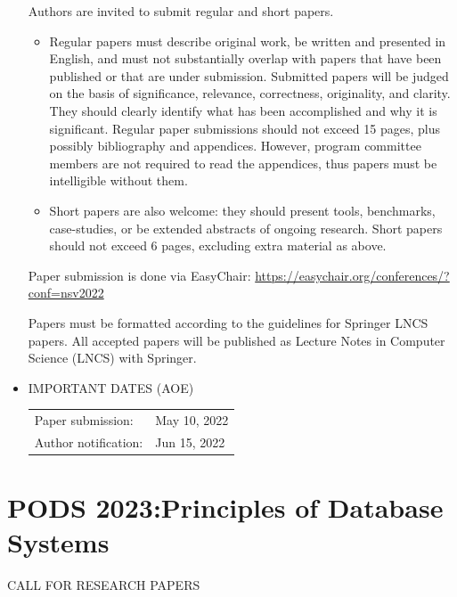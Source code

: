 \documentclass[prodmode,acmtecs]{acmsmall} %
\begin{document}
\begin{itemize}
  Authors are invited to submit regular and short papers. 
 
\begin{itemize}\item  Regular papers must describe original work, be written and presented in English, and must not substantially overlap with papers that have been published or that are under submission. Submitted papers will be judged on the basis of significance, relevance, correctness, originality, and clarity. They should clearly identify what has been accomplished and why it is significant. Regular paper submissions should not exceed 15 pages, plus possibly bibliography and appendices. However, program committee members are not required to read the appendices, thus papers must be intelligible without them.
\item  Short papers are also welcome: they should present tools, benchmarks, case-studies, or be extended abstracts of ongoing research. Short papers should not exceed 6 pages, excluding extra material as above.
\end{itemize} 
  Paper submission is done via EasyChair: \href{https://easychair.org/conferences/?conf=nsv2022}{https://easychair.org/conferences/?conf=nsv2022} 
 
  Papers must be formatted according to the guidelines for Springer LNCS papers. All accepted papers will be published as Lecture Notes in Computer Science (LNCS) with Springer. 
 
\item  IMPORTANT DATES  (AOE)  
 
\begin{tabulary}{\linewidth}{LL}Paper submission:  & May 10, 2022 \\
Author notification:  & Jun 15, 2022 \\
\end{tabulary}
 
\end{itemize}\section{PODS 2023:Principles of Database Systems }\label{PODS2023}CALL FOR RESEARCH PAPERS 
\end{document}
